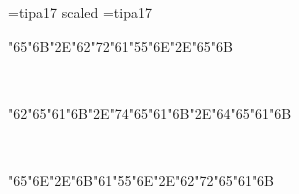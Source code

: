 \font\ipa=tipa17 scaled  \font\acc=tipa17
\def\tl#1{{\acc\accent"00 #1}}
\def\tm#1{{\acc\accent"09 #1}}
\def\u#1{{\acc\accent"08 #1}}
\def\th#1{{\acc\accent"01 #1}}
\def\thh#1{{\acc\accent"05 #1}}
\def\tll#1{{\acc\accent"0D #1}}
\null\vfill
\centerline{\ipa\char"65\ipa\char"6B\ipa\char"2E\ipa\char"62\ipa\char"72\ipa\char"61\ipa\char"55\ipa\char"6E\ipa\char"2E\ipa\char"65\ipa\char"6B}\

\centerline{\ipa\char"62\ipa\char"65\ipa\char"61\ipa\char"6B\ipa\char"2E\ipa\char"74\ipa\char"65\ipa\char"61\ipa\char"6B\ipa\char"2E\ipa\char"64\ipa\char"65\ipa\char"61\ipa\char"6B}\

\centerline{\ipa\char"65\ipa\char"6E\ipa\char"2E\ipa\char"6B\ipa\char"61\ipa\char"55\ipa\char"6E\ipa\char"2E\ipa\char"62\ipa\char"72\ipa\char"65\ipa\char"61\ipa\char"6B}\bye